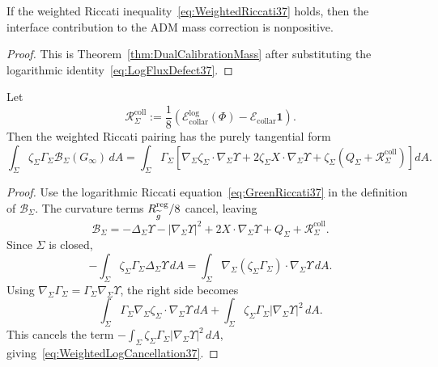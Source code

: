 \begin{proposition}\label{prop:WeightedRiccatiBarrier}
If the weighted Riccati inequality~\eqref{eq:WeightedRiccati37} holds, then the interface contribution to the ADM mass correction is nonpositive.
\end{proposition}

\begin{proof}
This is Theorem~\ref{thm:DualCalibrationMass} after substituting the logarithmic identity~\eqref{eq:LogFluxDefect37}.
\end{proof}

\begin{lemma}\label{lem:WeightedLogCancellation}
Let
\[
    \mathcal R_\Sigma^{\mathrm{coll}}
    :=
    \frac18\left(\mathcal E_{\mathrm{collar}}^{\log}(\Phi)
    -\mathcal E_{\mathrm{collar}}\mathbf 1\right).
\]
Then the weighted Riccati pairing has the purely tangential form
\begin{equation}\label{eq:WeightedLogCancellation37}
    \int_\Sigma \zeta_\Sigma\Gamma_\Sigma
    \mathcal B_\Sigma(G_\infty)\,dA
    =
    \int_\Sigma \Gamma_\Sigma
    \left[
        \nabla_\Sigma\zeta_\Sigma\cdot\nabla_\Sigma\Upsilon
        +2\zeta_\Sigma X\cdot\nabla_\Sigma\Upsilon
        +\zeta_\Sigma\left(Q_\Sigma+\mathcal R_\Sigma^{\mathrm{coll}}\right)
    \right]dA .
\end{equation}
\end{lemma}

\begin{proof}
Use the logarithmic Riccati equation~\eqref{eq:GreenRiccati37} in the definition of \(\mathcal B_\Sigma\). The curvature terms \(R_{\widetilde{g}}^{\mathrm{reg}}/8\) cancel, leaving
\[
    \mathcal B_\Sigma
    =
    -\Delta_\Sigma\Upsilon
    -|\nabla_\Sigma\Upsilon|^2
    +2X\cdot\nabla_\Sigma\Upsilon
    +Q_\Sigma
    +\mathcal R_\Sigma^{\mathrm{coll}} .
\]
Since \(\Sigma\) is closed,
\[
    -\int_\Sigma \zeta_\Sigma\Gamma_\Sigma\Delta_\Sigma\Upsilon\,dA
    =
    \int_\Sigma \nabla_\Sigma(\zeta_\Sigma\Gamma_\Sigma)\cdot\nabla_\Sigma\Upsilon\,dA .
\]
Using \(\nabla_\Sigma\Gamma_\Sigma=\Gamma_\Sigma\nabla_\Sigma\Upsilon\), the right side becomes
\[
    \int_\Sigma \Gamma_\Sigma\nabla_\Sigma\zeta_\Sigma\cdot\nabla_\Sigma\Upsilon\,dA
    +
    \int_\Sigma \zeta_\Sigma\Gamma_\Sigma|\nabla_\Sigma\Upsilon|^2\,dA .
\]
This cancels the term \(-\int_\Sigma\zeta_\Sigma\Gamma_\Sigma|\nabla_\Sigma\Upsilon|^2\,dA\), giving~\eqref{eq:WeightedLogCancellation37}.
\end{proof}

